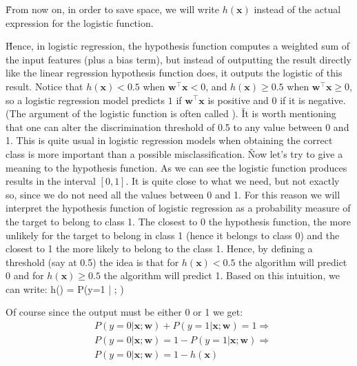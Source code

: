 \v

From now on, in order to save space, we will write $h(\boldsymbol{x})$ instead of the actual expression for the
logistic function.

\vspace{-5pt}


\v

Hence, in logistic regression, the hypothesis function computes a weighted sum of the input features (plus a bias
term), but instead of outputting the result directly like the linear regression hypothesis function does, it outputs
the logistic of this result. Notice that $h(\boldsymbol{x}) < 0.5$ when $\boldsymbol{w}^{\intercal} \boldsymbol{x} <
0$, and $h(\boldsymbol{x}) \geq 0.5$ when $\boldsymbol{w}^{\intercal} \boldsymbol{x} \geq 0$, so a logistic
regression model predicts $1$ if $\boldsymbol{w}^{\intercal} \boldsymbol{x}$ is positive and 0 if it is negative.
(The argument of the logistic function is often called ). \v

It is worth mentioning that one can alter the discrimination threshold of 0.5 to any value between 0 and 1. This is
quite usual in logistic regression models when obtaining the correct class is more important than a possible
misclassification. \v

Now let's try to give a meaning to the hypothesis function. As we can see the logistic function produces results in
the interval $[0,1]$. It is quite close to what we need, but not exactly so, since we do not need all the values
between 0 and 1. For this reason we will interpret the hypothesis function of logistic regression as a probability
measure of the target to belong to class 1. The closest to 0 the hypothesis function, the more unlikely for the
target to belong in class 1 (hence it belongs to class 0) and the closest to 1 the more likely to belong to the class
1. Hence, by defining a threshold (say at 0.5) the idea is that for $h (\boldsymbol{x}) <0.5$ the algorithm will
predict 0 and for $h(\boldsymbol{x}) \geq 0.5$ the algorithm will predict 1. Based on this intuition, we can write:
\bse
h() = P(y=1 | ; )
\ese

Of course since the output must be either 0 or 1 we get:
\begin{align*}
& P(y=0 | \boldsymbol{x}; \boldsymbol{w}) + P(y=1 | \boldsymbol{x}; \boldsymbol{w}) = 1 \Rightarrow \\
& P(y=0 | \boldsymbol{x}; \boldsymbol{w}) = 1 - P(y=1 | \boldsymbol{x}; \boldsymbol{w}) \Rightarrow \\
& P(y=0 | \boldsymbol{x}; \boldsymbol{w}) = 1 - h(\boldsymbol{x})
\end{align*}

